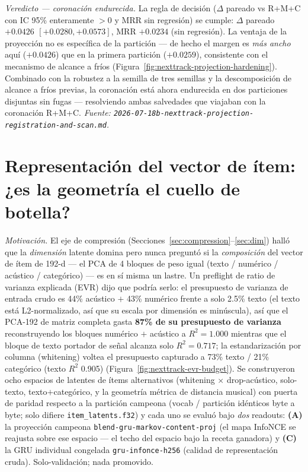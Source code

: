 \documentclass[11pt]{article}
\begin{document}
\emph{Veredicto --- coronación endurecida.} La regla de decisión ($\Delta$ pareado
vs R+M+C con IC 95\% enteramente $>0$ y MRR sin regresión) se cumple: $\Delta$
pareado \textbf{$+\num{0.0426}$ $[+0.0280, +0.0573]$}, MRR $+\num{0.0234}$ (sin
regresión). La ventaja de la proyección no es específica de la partición --- de
hecho el margen es \emph{más ancho} aquí ($+\num{0.0426}$) que en la primera
partición ($+\num{0.0259}$), consistente con el mecanismo de alcance a fríos
(Figura~\ref{fig:nexttrack-projection-hardening}). Combinado con la robustez a la
semilla de tres semillas y la descomposición de alcance a fríos previas, la
coronación está ahora endurecida en dos particiones disjuntas sin fugas ---
resolviendo ambas salvedades que viajaban con la coronación R+M+C.
\emph{Fuente: \texttt{2026-07-18b-nexttrack-projection-registration-and-scan.md}.}

\section{Representación del vector de ítem: ¿es la geometría el cuello de botella?}
\label{sec:representation}
\emph{Motivación.} El eje de compresión (Secciones~\ref{sec:compression}--\ref{sec:dim})
halló que la \emph{dimensión} latente domina pero nunca preguntó si la
\emph{composición} del vector de ítem de 192-d --- el PCA de 4 bloques de peso igual
(texto / numérico / acústico / categórico) --- es en sí misma un lastre. Un
preflight de ratio de varianza explicada (EVR) dijo que podría serlo: el presupuesto
de varianza de entrada crudo es 44\% acústico $+$ 43\% numérico frente a solo 2.5\%
texto (el texto está L2-normalizado, así que su escala por dimensión es minúscula),
así que el PCA-192 de matriz completa gasta \textbf{87\% de su presupuesto de
varianza} reconstruyendo los bloques numérico $+$ acústico a $R^2 = \num{1.000}$
mientras que el bloque de texto portador de señal alcanza solo $R^2 = \num{0.717}$;
la estandarización por columna (whitening) voltea el presupuesto capturado a 73\%
texto / 21\% categórico (texto $R^2$ \num{0.905})
(Figura~\ref{fig:nexttrack-evr-budget}). Se construyeron ocho espacios de latentes
de ítems alternativos (whitening $\times$ drop-acústico, solo-texto,
texto$+$categórico, y la geometría métrica de distancia musical) con puerta de
paridad respecto a la partición campeona (vocab / partición idénticos byte a byte;
solo difiere \texttt{item\_latents.f32}) y cada uno se evaluó bajo \emph{dos}
readouts: \textbf{(A)} la proyección campeona \texttt{blend-gru-markov-content-proj}
(el mapa InfoNCE se reajusta sobre ese espacio --- el techo del espacio bajo la
receta ganadora) y \textbf{(C)} la GRU individual congelada
\texttt{gru-infonce-h256} (calidad de representación cruda). Solo-validación; nada
promovido.
\end{document}
